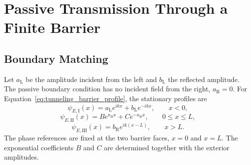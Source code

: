 \section{Passive Transmission Through a Finite Barrier}
\label{sec:tunneling_passive_transmission}

\subsection{Boundary Matching}

Let $a_{\mathrm L}$ be the amplitude incident from the left and $b_{\mathrm L}$ the reflected amplitude. The passive boundary condition has no incident field from the right, $a_{\mathrm R}=0$. For Equation~\eqref{eq:tunneling_barrier_profile}, the stationary profiles are
\begin{equation}
    \psi_{E,\mathrm I}(x)
    =a_{\mathrm L}e^{ikx}+b_{\mathrm L}e^{-ikx},
    \qquad x<0,
    \label{eq:tunneling_region_I}
\end{equation}
\begin{equation}
    \psi_{E,\mathrm{II}}(x)
    =Be^{\kappa_{\mathrm B}x}+Ce^{-\kappa_{\mathrm B}x},
    \qquad 0\leq x\leq L,
    \label{eq:tunneling_region_II}
\end{equation}
\begin{equation}
    \psi_{E,\mathrm{III}}(x)
    =b_{\mathrm R}e^{ik(x-L)},
    \qquad x>L.
    \label{eq:tunneling_region_III}
\end{equation}
The phase references are fixed at the two barrier faces, $x=0$ and $x=L$. The exponential coefficients $B$ and $C$ are determined together with the exterior amplitudes.

